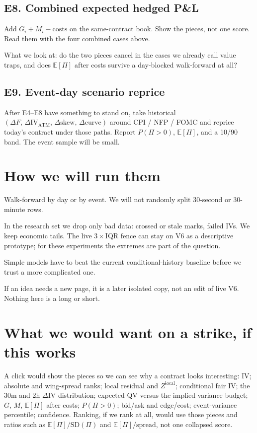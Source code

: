 \documentclass[11pt]{article}
\begin{document}
\subsection{E8. Combined expected hedged P\&L}

Add \(G_i+M_i-\mathrm{costs}\) on the same-contract book.  Show the
pieces, not one score.  Read them with the four combined cases
above.

What we look at: do the two pieces cancel in the cases we already
call value traps, and does \(\mathbb{E}[\Pi]\) after costs survive a
day-blocked walk-forward at all?

\subsection{E9. Event-day scenario reprice}

After E4--E8 have something to stand on, take historical
\((\Delta F,\,\Delta\mathrm{IV}_{\mathrm{ATM}},\,\Delta\mathrm{skew},\,\Delta\mathrm{curve})\)
around CPI / NFP / FOMC and reprice today's contract under those
paths.  Report \(P(\Pi>0)\), \(\mathbb{E}[\Pi]\), and a
10/90 band.  The event sample will be small.


\section{How we will run them}

Walk-forward by day or by event.  We will not randomly split
30-second or 30-minute rows.

In the research set we drop only bad data: crossed or stale marks,
failed IVs.  We keep economic tails.  The live \(3\times\mathrm{IQR}\)
fence can stay on V6 as a descriptive prototype; for these
experiments the extremes are part of the question.

Simple models have to beat the current conditional-history baseline
before we trust a more complicated one.
 
If an idea needs a new page, it is a later isolated copy, not an
edit of live V6.  Nothing here is a long or short.


\section{What we would want on a strike, if this works}

A click would show the pieces so we can see why a contract looks
interesting: IV; absolute and wing-spread ranks; local residual and
\(Z^{\mathrm{local}}\); conditional fair IV; the 30m and 2h
\(\Delta\mathrm{IV}\) distribution; expected QV versus the implied
variance budget; \(G\), \(M\), \(\mathbb{E}[\Pi]\) after costs;
\(P(\Pi>0)\); bid/ask and edge/cost; event-variance percentile;
confidence.  Ranking, if we rank at all, would use those pieces and
ratios such as \(\mathbb{E}[\Pi]/\mathrm{SD}(\Pi)\) and
\(\mathbb{E}[\Pi]/\mathrm{spread}\), not one collapsed score.
\end{document}
